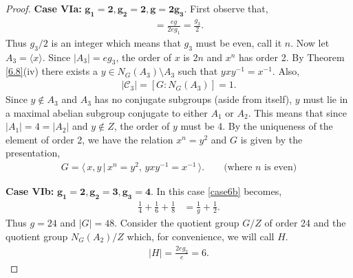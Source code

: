 \begin{proof}
 \space \textbf{Case VIa:} $\pmb{g_1 = 2, g_2 = 2, g=2 g_3}$. First observe that,
\begin{align*} [G : N_G(A_1)] = \frac{eg}{2eg_1} = \frac{g_3}{2}.
\end{align*}
Thus $g_3/2$ is an integer which means that $g_3$ must be even, call it $n$. Now let $A_3 = \langle x \rangle$. Since $|A_3| = eg_3$, the order of $x$ is $2n$ and $x^n$ has order 2. By Theorem \eqref{6.8}(iv) there exists a $y \in N_G(A_3) \! \setminus \! A_3$ such that $y x y^{-1} = x^{-1}$. Also,
\begin{align*} |\mathcal{C}_3| = [G : N_G(A_3)] = 1.
\end{align*}
Since $y \not \in A_3$ and $A_3$ has no conjugate subgroups (aside from itself), $y$ must lie in a maximal abelian subgroup conjugate to either $A_1$ or $A_2$. This means that since $|A_1| = 4 = |A_2|$ and $y \not \in Z$, the order of $y$ must be 4. By the uniqueness of the element of order 2, we have the relation $x^n = y^2$ and $G$ is given by the presentation,
\begin{align*} G = \langle \, x,y \, | \, x^n = y^2, \, yxy^{-1} = x^{-1} \, \rangle. \qquad \text{(where $n$ is even)}
\end{align*}

 \space \textbf{Case VIb:} $\pmb{g_1 = 2, g_2 = 3, g_3 = 4}$. In this case \eqref{case6b} becomes,
\begin{align*} \frac{1}{4} + \frac{1}{6} + \frac{1}{8} &= \frac{1}{g} + \frac{1}{2}.
\end{align*}
Thus $g = 24$ and $|G| = 48$. Consider the quotient group $G / Z$ of order 24 and the quotient group $N_G(A_2) / Z$ which, for convenience, we will call $H$.
\begin{align*} |H| = \frac{2eg_2}{e} = 6.
\end{align*}


\end{proof}
